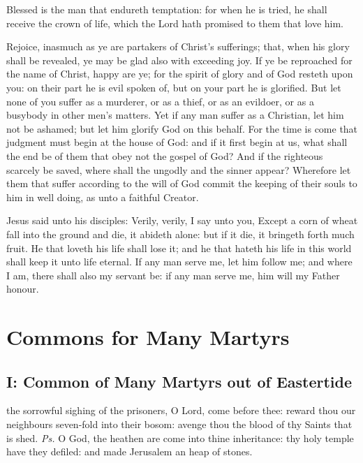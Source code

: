 Blessed is the man that endureth temptation: for when he is tried, he shall receive the crown of life, which the Lord hath promised to them that love him.

\label{1Peter413}
 Rejoice, inasmuch as ye are partakers of Christ's sufferings; that, when his glory shall be revealed, ye may be glad also with exceeding joy. If ye be reproached for the name of Christ, happy are ye; for the spirit of glory and of God resteth upon you: on their part he is evil spoken of, but on your part he is glorified. But let none of you suffer as a murderer, or as a thief, or as an evildoer, or as a busybody in other men's matters. Yet if any man suffer as a Christian, let him not be ashamed; but let him glorify God on this behalf. For the time is come that judgment must begin at the house of God: and if it first begin at us, what shall the end be of them that obey not the gospel of God? And if the righteous scarcely be saved, where shall the ungodly and the sinner appear? Wherefore let them that suffer according to the will of God commit the keeping of their souls to him in well doing, as unto a faithful Creator.

 Jesus said unto his disciples: Verily, verily, I say unto you, Except a corn of wheat fall into the ground and die, it abideth alone: but if it die, it bringeth forth much fruit. He that loveth his life shall lose it; and he that hateth his life in this world shall keep it unto life eternal. If any man serve me, let him follow me; and where I am, there shall also my servant be: if any man serve me, him will my Father honour.

\section{Commons for Many Martyrs}

\subsection{I: Common of Many Martyrs out of Eastertide}\label{CommonMartyrsI}

\introit
{} the sorrowful sighing of the prisoners, O Lord, come before thee: reward thou our neighbours seven-fold into their bosom: avenge thou the blood of thy Saints that is shed. \textit{Ps.} O God, the heathen are come into thine inheritance: thy holy temple have they defiled: and made Jerusalem an heap of stones.

